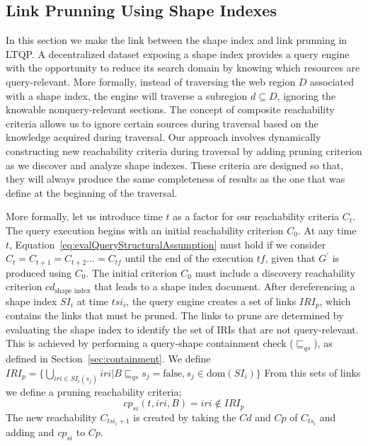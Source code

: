 \subsection{Link Prunning Using Shape Indexes}\label{sec:sourceSelection}

In this section we make the link between the shape index and link prunning in LTQP.
A decentralized dataset exposing a shape index provides a query engine with the opportunity to reduce its search domain by knowing which resources are query-relevant.
More formally, instead of traversing the web region $D$ associated with a shape index, the engine will traverse a subregion $d \subseteq D$, ignoring the knowable nonquery-relevant sections.
The concept of composite reachability criteria allows us to ignore certain sources during traversal based on the knowledge acquired during traversal.
Our approach involves dynamically constructing new reachability criteria during traversal by adding pruning criterion as we discover and analyze shape indexes.
These criteria are designed so that, they will always produce the same completeness of results as the one that was define at the beginning of the traversal.

More formally, let us introduce time $t$ as a factor for our reachability criteria $C_t$.
The query execution begins with an initial reachability criterion $C_0$.
At any time $t$, Equation~\ref{eq:evalQueryStructuralAssumption} must hold if we consider $C_t = C_{t+1} = C_{t+2} \dots = C_{tf}$ until the end of the execution $tf$, given that $G^{\prime}$ is produced using $C_0$.
The initial criterion $C_0$ must include a discovery reachability criterion $cd_{\text{shape index}}$ that leads to a shape index document.
After dereferencing a shape index $SI_i$ at time $tsi_i$, the query engine creates a set of links $IRI_p$, which contains the links that must be pruned.
The links to prune are determined by evaluating the shape index to identify the set of IRIs that are not query-relevant.
This is achieved by performing a query-shape containment check ($\sqsubseteq_{qs}$), as defined in Section~\ref{sec:containment}.
We define
$IRI_p = \{ \bigcup_{iri \in SI_i(s_j)} iri | B \sqsubseteq_{qs}  s_j = \mathrm{false}, s_j \in \text{dom}(SI_i) \}$
From this sets of links we define a pruning reachability criteria;
\begin{equation}
       cp_{si}(t, iri, B) = iri \notin IRI_p
\end{equation}
The new reachability $C_{tsi_i + 1}$ is created by taking the $Cd$ and $Cp$ of $C_{ts_i}$ and adding
and $cp_{si}$ to $Cp$.


